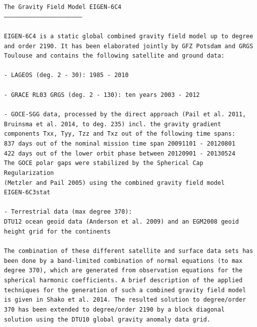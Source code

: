 \documentclass[a4paper, 12pt]{book}
\begin{document}
\noindent\texttt{The Gravity Field Model EIGEN-6C4\\
\noindent -----------------------------------------------------------------\\
\\
\noindent EIGEN-6C4 is a static global combined gravity field model up to 
degree and order 2190.  It has been elaborated jointly  by GFZ Potsdam and GRGS 
Toulouse and contains the following  satellite and ground data:
\\
\\
\noindent - LAGEOS (deg. 2 - 30): 1985 - 2010
\\
\\
\noindent - GRACE RL03 GRGS (deg. 2 - 130): ten years 2003 - 2012
\\
\\
\noindent - GOCE-SGG data, processed by the direct approach (Pail et 
al. 2011,\\
\phantom{- }Bruinsma et al. 2014, to deg. 235) incl. the gravity gradient\\
\phantom{- }components Txx, Tyy, Tzz and Txz out of the following time spans:\\
\phantom{- }837 days out of the nominal mission time span 20091101 - 20120801\\
\phantom{- }422 days out of the lower orbit phase between 20120901 - 20130524\\
\phantom{- }The GOCE polar gaps were stabilized by the Spherical Cap 
Regularization\\
\phantom{- }(Metzler and Pail 2005) using the combined gravity field model\\
\phantom{- }EIGEN-6C3stat\\
\\
\noindent - Terrestrial data (max degree 370):\\
\phantom{- }DTU12 ocean geoid data (Anderson et al. 2009) and an EGM2008 geoid 
\phantom{- }height grid for the continents
\\
\\
\noindent The combination of these different satellite and surface data sets 
has been done by a band-limited combination of normal equations (to max degree 
370), which are generated from observation equations for the spherical harmonic 
coefficients. A brief description of the applied techniques for the generation 
of such a combined gravity field model is given in Shako et al. 2014. The 
resulted solution to degree/order 370 has been extended to degree/order 2190 by 
a block diagonal solution using the DTU10 global gravity anomaly data grid.
}
\end{document}
